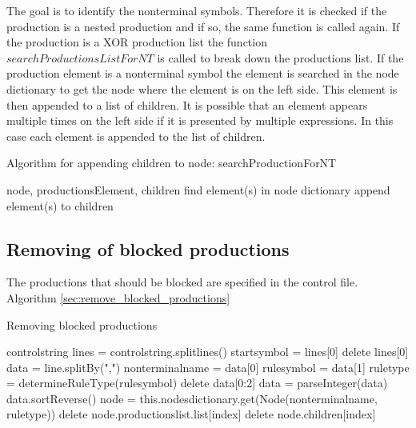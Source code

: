 The goal is to identify the nonterminal symbols. Therefore it is checked if the production is a nested production and if so, the same function is called again. If the production is a XOR production list the function $searchProductionsListForNT$ is called to break down the productions list. If the production element is a nonterminal symbol the element is searched in the node dictionary to get the node where the element is on the left side. This element is then appended to a list of children. It is possible that an element appears multiple times on the left side if it is presented by multiple expressions. In this case each element is appended to the list of children.

\begin{algorithm}[H]
\caption{Algorithm for appending children to node: searchProductionForNT}
\begin{algorithmic}[1] 
\Require node, productionsElement, children
		\State find element(s) in node dictionary
		\State append element(s) to children
	\EndIf
\EndFor
\end{algorithmic}
\end{algorithm}

\subsection{Removing of blocked productions}
The productions that should be blocked are specified in the control file.  
Algorithm \ref{sec:remove_blocked_productions}
\begin{algorithm}[H]
\caption{Removing blocked productions}
\begin{algorithmic}[1] 
\Require control\textunderscore string
\State lines = control\textunderscore string.splitlines()
\State start\textunderscore symbol = lines[0]
\State delete lines[0]
	\State data = line.splitBy(",")
	\State nonterminal\textunderscore name = data[0]
	\State rule\textunderscore symbol = data[1]
	\State rule\textunderscore type = determineRuleType(rule\textunderscore symbol)
	\State delete data[0:2]
	\State data = parseInteger(data)
	\State data.sortReverse()
		\State node = this.nodes\textunderscore dictionary.get(Node(nonterminal\textunderscore name, rule\textunderscore type))
		\State delete node.productions\textunderscore list.list[index]
		\State delete node.children[index]
	\EndFor
\EndFor
\end{algorithmic}
\label{alg:remove_blocked_productions}
\end{algorithm}

